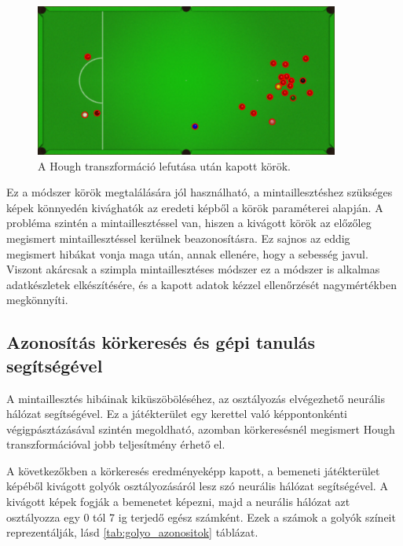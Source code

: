\begin{figure}[!ht]
    \centering
    \includegraphics[width=100mm, keepaspectratio]{figures/detected_circles.png}
    \caption{A Hough transzformáció lefutása után kapott körök.}
    \label{fig:talalt_korok}
\end{figure}

\par Ez a módszer körök megtalálására jól használható, a mintaillesztéshez szükséges képek könnyedén kivághatók az eredeti képből a körök paraméterei alapján. A probléma szintén a mintaillesztéssel van, hiszen a kivágott körök az előzőleg megismert mintaillesztéssel kerülnek beazonosításra. Ez sajnos az eddig megismert hibákat vonja maga után, annak ellenére, hogy a sebesség javul. Viszont akárcsak a szimpla mintaillesztéses módszer ez a módszer is alkalmas adatkészletek elkészítésére, és a kapott adatok kézzel ellenőrzését nagymértékben megkönnyíti.

\subsection{Azonosítás körkeresés és gépi tanulás segítségével}
A mintaillesztés hibáinak kiküszöböléséhez, az osztályozás elvégezhető neurális hálózat segítségével. Ez a játékterület egy kerettel való képpontonkénti végigpásztázásával szintén megoldható, azomban körkeresésnél megismert Hough transzformációval jobb teljesítmény érhető el.

\par A következőkben a körkeresés eredményeképp kapott, a bemeneti játékterület képéből kivágott golyók osztályozásáról lesz szó neurális hálózat segítségével. A kivágott képek fogják a bemenetet képezni, majd a neurális hálózat azt osztályozza egy 0 tól 7 ig terjedő egész számként. Ezek a számok a golyók színeit reprezentálják, lásd \ref{tab:golyo_azonositok} táblázat.


